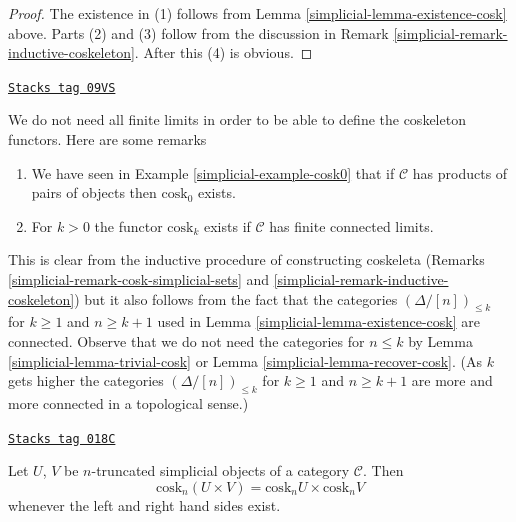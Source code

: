 \begin{proof}

The existence in (1) follows from Lemma \ref{simplicial-lemma-existence-cosk} above.
Parts (2) and (3) follow from the discussion
in Remark \ref{simplicial-remark-inductive-coskeleton}. After this (4) is obvious.
\end{proof}

\begin{remark}
\label{simplicial-remark-existence-cosk}
\href{https://stacks.math.columbia.edu/tag/09VS}{\texttt{Stacks tag 09VS}}

We do not need all finite limits in order to be able to define
the coskeleton functors. Here are some remarks
\begin{enumerate}
\item We have seen in Example \ref{simplicial-example-cosk0} that if $\mathcal{C}$
has products of pairs of objects then $\text{cosk}_0$ exists.
\item For $k > 0$ the functor $\text{cosk}_k$ exists if
$\mathcal{C}$ has finite connected limits.
\end{enumerate}
This is clear from the inductive procedure of constructing coskeleta
(Remarks \ref{simplicial-remark-cosk-simplicial-sets} and
\ref{simplicial-remark-inductive-coskeleton}) but it also follows from the fact that
the categories $(\Delta/[n])_{\leq k}$ for $k \geq 1$ and
$n \geq k + 1$ used in Lemma \ref{simplicial-lemma-existence-cosk}
are connected. Observe that we do not need the categories
for $n \leq k$ by Lemma \ref{simplicial-lemma-trivial-cosk} or
Lemma \ref{simplicial-lemma-recover-cosk}. (As $k$ gets higher the categories
$(\Delta/[n])_{\leq k}$ for $k \geq 1$ and $n \geq k + 1$ are more
and more connected in a topological sense.)
\end{remark}

\begin{lemma}
\label{simplicial-lemma-cosk-product}
\href{https://stacks.math.columbia.edu/tag/018C}{\texttt{Stacks tag 018C}}

Let $U$, $V$ be $n$-truncated simplicial objects of a
category $\mathcal{C}$. Then
$$
\text{cosk}_n (U \times V) = \text{cosk}_nU \times \text{cosk}_nV
$$
whenever the left and right hand sides exist.
\end{lemma}

